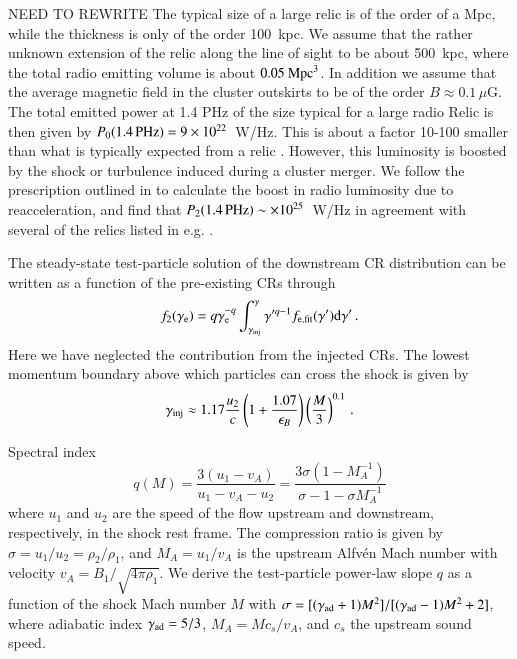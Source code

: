 \documentclass[useAMS,usenatbib]{mn2e}
\newcommand{\dd}{\mathrm{d}}
\newcommand{\gae}{\gamma_\mathrm{e}}
\newcommand{\gam}{\gamma}
\begin{document}
NEED TO REWRITE The typical size of a large relic is of the order of a
Mpc, while the thickness is only of the order 100~kpc. We assume that
the rather unknown extension of the relic along the line of sight to
be about 500~kpc, where the total radio emitting volume is about
$0.05~{\mathrm{Mpc}}^3$. In addition we assume that the average magnetic
field in the cluster outskirts to be of the order
$B\approx0.1\,\mu$G. The total emitted power at 1.4 PHz of the size
typical for a large radio Relic is then given by
$P_0(1.4\,{\mathrm{PHz}})=9\times10^{22}$~W/Hz. This is about a factor
10-100 smaller than what is typically expected from a relic
\cite{2009A&A...508...75V}. However, this luminosity is boosted by the
shock or turbulence induced during a cluster merger. We follow the
prescription outlined in \cite{2011ApJ...734...18K} to calculate the
boost in radio luminosity due to reacceleration, and find that
$P_2(1.4\,{\mathrm{PHz}})\sim\times10^{25}$~W/Hz in agreement with several
of the relics listed in e.g. \cite{2009A&A...508...75V}.

The steady-state test-particle solution of the downstream CR
distribution can be written as a function of the pre-existing CRs through
\begin{equation}
  f_2(\gae) = q \gae^{-q}\int_{\gam_\rmn{inj}}^\gam \gam'^{q-1}
   f_\rmn{e,fit}(\gam')\dd \gam'\,.
\end{equation}
Here we have neglected the contribution from the injected CRs. The lowest momentum boundary above which particles can cross the shock is given by 
\begin{equation}
\gam_\rmn{inj} \approx 1.17 \frac{u_2}{c}\left(1+\frac{1.07}{\epsilon_B}\right)
\left(\frac{M}{3}\right)^{0.1}\,.
\end{equation}

Spectral index
\begin{equation}
q(M) = \frac{3\left(u_1-v_ A\right)}{u_1-v_A-u_2} = 
\frac{3\sigma\left(1-M_A^{-1}\right)}{\sigma-1-\sigma M_A^{-1}}
\end{equation}
where $u_1$ and $u_2$ are the speed of the flow upstream and
downstream, respectively, in the shock rest frame. The compression
ratio is given by $\sigma=u_1/u_2=\rho_2/\rho_1$, and $M_A=u_1/v_A$ is
the upstream Alfvén Mach number with velocity
$v_A=B_1/\sqrt{4\pi\rho_1}$. We derive the test-particle power-law
slope $q$ as a function of the shock Mach number $M$ with
$\sigma=[(\gam_\rmn{ad}+1)M^2]/[(\gam_\rmn{ad}-1)M^2+2]$, where
adiabatic index $\gam_\rmn{ad}=5/3$, $M_A=M c_s/v_A$, and $ c_s$ the
upstream sound speed.
\end{document}
